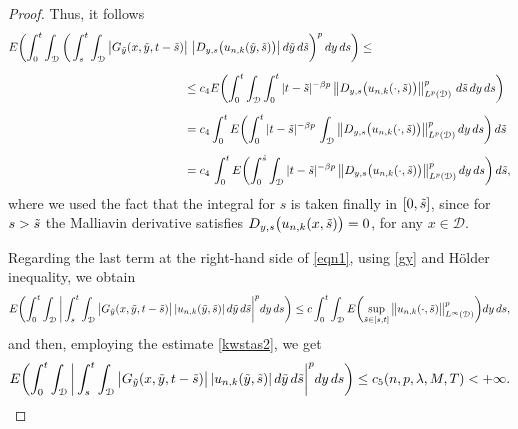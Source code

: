 \documentclass[reqno]{amsart}
\numberwithin{equation}{section}
\newcommand{\cd}{\mathcal{D}}
\begin{document}
\begin{proof}
Thus, it follows
\begin{align}
E\biggl(\int_0^t\int_{\cd}\bigg(\int_s^t\int_{\cd}\big|G_{\Tilde{y}}(x,\Tilde{y},t-\Tilde{s})&\big|\ \big|D_{y,s}\bigl(u_{n,k}(\Tilde{y},\Tilde{s})\bigr)\big|\, d\Tilde{y}\,d\Tilde{s}\bigg)^p\, dy\,ds\biggr)\leq
\nonumber\\[0.2cm]
&\leq  c_4 E\biggl(\int_0^t\int_{\cd}\int_0^t  |t-\Tilde{s}|^{-\beta p} \, \big\|D_{y,s}\bigl(u_{n,k}(\cdot,\Tilde{s})\bigr) \big\|^p_{L^p(\cd)}\ d\Tilde{s}\, dy\,ds\biggr)
\nonumber\\[0.2cm]
&=
c_4 \int_0^t E\biggl(\int_0^t  |t-\Tilde{s}|^{-\beta p} \, \int_{\cd}\big\|D_{y,s}\bigl(u_{n,k}(\cdot,\Tilde{s})\bigr) \big\|^p_{L^p(\cd)}\, dy\,ds\biggr)\,d\Tilde{s}\nonumber\\[0.2cm]
&=
c_4
\, \int_0^t E\biggl(\int_0^{\Tilde{s}}\int_{\cd}  |t-\Tilde{s}|^{-\beta p} \, \big{\|}D_{y,s}\bigl{(}u_{n,k}(\cdot,\Tilde{s})\bigr{)} \big{\|}^p_{L^p(\cd)}\, dy\,ds\biggr)\,d\Tilde{s} ,
\label{Gest2}
\end{align}
where we used the fact that the integral for $s$ is taken finally in $[0,\Tilde{s}]$, since for $s>\Tilde{s}$ the Malliavin derivative satisfies
$D_{y,s}\bigl{(}u_{n,k}(x,\Tilde{s})\bigr{)}=0$, for any
$x\in\cd$.

Regarding the last term at the right-hand side of \eqref{eqn1}, using \eqref{gy} and H\"older inequality, we obtain
\begin{align*}
E\biggl(\int_0^t\int_{\cd}\bigg|\int_s^t\int_{\cd}\big|G_{\Tilde{y}}(x,\Tilde{y},t-\Tilde{s})\big|\,
|u_{n,k}(\Tilde{y},\Tilde{s})|\, d\Tilde{y}\,d\Tilde{s}\bigg|^p dy\,ds\biggr) \leq
c\int_0^t\int_{\cd} E\biggl(\sup_{\tilde{s}\in[s,t]}\big\|u_{n,k}(\cdot,\Tilde{s})\big\|^p_{L^{\infty}(\cd)}\biggr)dy\,
ds,
\end{align*}
and then, employing the estimate \eqref{kwstas2}, we get
\begin{equation}\label{Gest3}
E\biggl(\int_0^t\int_{\cd}\bigg|\int_s^t\int_{\cd}\big|G_{\Tilde{y}}(x,\Tilde{y},t-\Tilde{s})\big|\,
|u_{n,k}(\Tilde{y},\Tilde{s})|\, d\Tilde{y}\,d\Tilde{s}\bigg|^p dy\,ds\biggr)
\leq c_5(n,p,\lambda,M,T)<+\infty.
\end{equation}


\end{proof}
\end{document}
